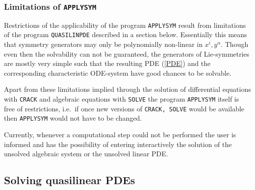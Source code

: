 \subsubsection{Limitations of {\tt APPLYSYM}}
Restrictions of the applicability of the program {\tt APPLYSYM} result
from limitations of the program {\tt QUASILINPDE} described in a section below.
Essentially this means that symmetry generators may only be polynomially
non-linear in $x^i, y^\alpha$.
Though even then the solvability can not be guaranteed, the
generators of Lie-symmetries are mostly very simple such that the
resulting PDE (\ref{PDE}) and the corresponding characteristic 
ODE-system have good chances to be solvable.

Apart from these limitations implied through the solution of differential
equations with {\tt CRACK} and algebraic equations with {\tt SOLVE}
the program {\tt APPLYSYM} itself is free of restrictions,
i.e.\ if once new versions of {\tt CRACK, SOLVE}
would be available then {\tt APPLYSYM} would not have to be changed.

Currently, whenever a computational step could not be performed
the user is informed and has the possibility of entering interactively
the solution of the unsolved algebraic system or the unsolved linear PDE.
\subsection{Solving quasilinear PDEs}
